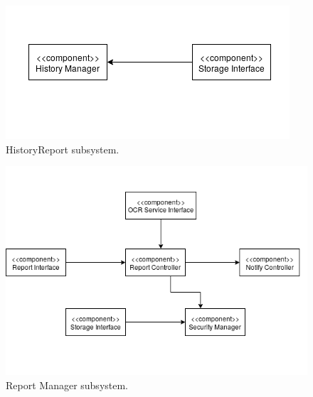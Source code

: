 \documentclass{report}
\begin{document}
\begin{figure}[!ht]
	\begin{center}
	\includegraphics[width=\textwidth]{img/HistorySub.png}
    \end{center}
    \label{fig:HistorySub}
	\caption{HistoryReport subsystem.}
\end{figure}
\begin{figure}[!ht]
	\begin{center}
	\includegraphics[width=\textwidth]{img/ReportSub.png}
    \end{center}
    \label{fig:ReportSub}
	\caption{Report Manager subsystem.}
\end{figure}
\end{document}
